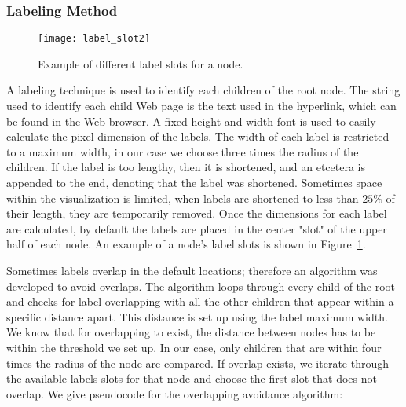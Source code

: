 \documentclass[10pt,psfig]{article}
\begin{document}
{%

\subsubsection{Labeling Method}
\label{se:labels}

\begin{figure}[t]
\centering
\texttt{[image: label\_slot2]}
\caption{Example of different label slots for a node.}
\label{fig_slots}
\end{figure}


A labeling technique is used to identify each children of the root node.
The string used to identify each child Web page is the text used in the hyperlink, which can be found in the Web browser.
A fixed height and width font is used to easily calculate the pixel dimension of the labels.
The width of each label is restricted to a maximum width, in our case we choose three times the radius of the children.
If the label is too lengthy, then it is shortened, and an etcetera is appended to the end, denoting that the label was shortened.
Sometimes space within the visualization is limited, when labels are shortened to less than $25\%$ of their length, they are temporarily removed.
Once the dimensions for each label are calculated, by default the labels are placed in the center "slot" of the upper half of each node.
 An example of a node's label slots is shown in Figure~\ref{fig_slots}.

Sometimes labels overlap in the default locations; therefore an algorithm was developed to avoid overlaps.
The algorithm loops through every child of the root and checks for label overlapping with all the other children that appear within a specific distance apart.
This distance is set up using the label maximum width.
We know that for overlapping to exist, the distance between nodes has to be within the threshold we set up.
In our case, only children that are within four times the radius of the node are compared.
If overlap exists, we iterate through the available labels slots for that node and choose the first slot that does not overlap.
We give pseudocode for the overlapping avoidance algorithm:

}
\end{document}
